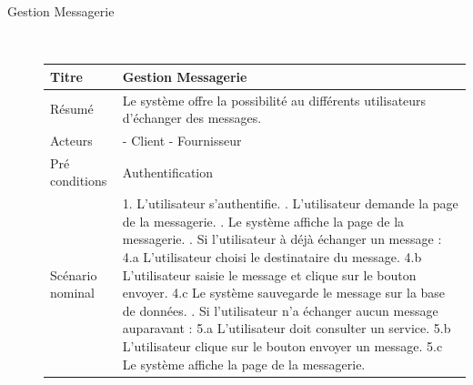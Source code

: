 \documentclass[french]{report}
\begin{document}
\begin{description}
    \newpage
        \item[Gestion Messagerie] \hfill \newline \\
        \begin{minipage}{\linewidth}
        \centering
            \def\arraystretch{2}
            \begin{tabular}{|m{3cm}|m{9cm}|}
            \hline
            Titre                & Gestion Messagerie                                                                                                 \\ 
            \hline
            Résumé               & Le système offre la possibilité au différents utilisateurs d'échanger des messages.  \\ 
            \hline
            Acteurs              & - Client \newline  - Fournisseur                                                                                    \\ 
            \hline
            Pré conditions       & Authentification                                                                                                      \\ 
            \hline
            Scénario nominal     &  
                1. L'utilisateur s'authentifie. \newline
                2. L'utilisateur demande la page de la messagerie. \newline
                3. Le système affiche la page de la messagerie. \newline
                4. Si l'utilisateur à déjà échanger un message :\newline
                	4.a L'utilisateur choisi le destinataire du message. \newline
                	4.b L'utilisateur saisie le message et clique sur le bouton envoyer. \newline
                	4.c Le système sauvegarde le message sur la base de données. \newline
                5. Si l'utilisateur n'a échanger aucun message auparavant : \newline
                	5.a L'utilisateur doit consulter un service. \newline
                	5.b L'utilisateur clique sur le bouton envoyer un message. \newline
                	5.c Le système affiche la page de la messagerie. \newline

\end{tabular}
\end{minipage}
\end{description}
\end{document}
